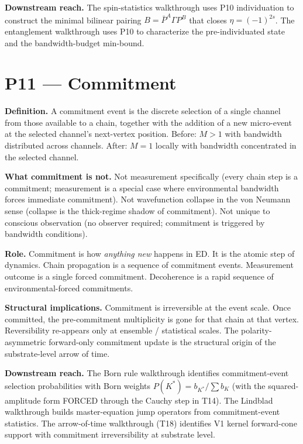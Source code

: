 \documentclass[11pt,a4paper]{article}
\begin{document}
\textbf{Downstream reach.} The spin-statistics walkthrough uses P10 individuation to construct the minimal bilinear pairing $B = \bar P^A \Gamma P^B$ that closes $\eta = (-1)^{2s}$. The entanglement walkthrough uses P10 to characterize the pre-individuated state and the bandwidth-budget min-bound.

\section{P11 --- Commitment}

\textbf{Definition.} A commitment event is the discrete selection of a single channel from those available to a chain, together with the addition of a new micro-event at the selected channel's next-vertex position. Before: $M > 1$ with bandwidth distributed across channels. After: $M = 1$ locally with bandwidth concentrated in the selected channel.

\textbf{What commitment is not.} Not measurement specifically (every chain step is a commitment; measurement is a special case where environmental bandwidth forces immediate commitment). Not wavefunction collapse in the von Neumann sense (collapse is the thick-regime shadow of commitment). Not unique to conscious observation (no observer required; commitment is triggered by bandwidth conditions).

\textbf{Role.} Commitment is how \emph{anything new} happens in ED. It is the atomic step of dynamics. Chain propagation is a sequence of commitment events. Measurement outcome is a single forced commitment. Decoherence is a rapid sequence of environmental-forced commitments.

\textbf{Structural implications.} Commitment is irreversible at the event scale. Once committed, the pre-commitment multiplicity is gone for that chain at that vertex. Reversibility re-appears only at ensemble / statistical scales. The polarity-asymmetric forward-only commitment update is the structural origin of the substrate-level arrow of time.

\textbf{Downstream reach.} The Born rule walkthrough identifies commitment-event selection probabilities with Born weights $P(K^*) = b_{K^*}/\sum b_K$ (with the squared-amplitude form FORCED through the Cauchy step in T14). The Lindblad walkthrough builds master-equation jump operators from commitment-event statistics. The arrow-of-time walkthrough (T18) identifies V1 kernel forward-cone support with commitment irreversibility at substrate level.
\end{document}
